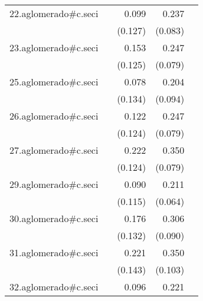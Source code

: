 {\begin{longtable}{l*{4}{D{.}{.}{-1}}}
\addlinespace
22.aglomerado#c.seci&                     &       0.099         &       0.237\sym{**} &                     \\
            &                     &     (0.127)         &     (0.083)         &                     \\
\addlinespace
23.aglomerado#c.seci&                     &       0.153         &       0.247\sym{**} &                     \\
            &                     &     (0.125)         &     (0.079)         &                     \\
\addlinespace
25.aglomerado#c.seci&                     &       0.078         &       0.204\sym{*}  &                     \\
            &                     &     (0.134)         &     (0.094)         &                     \\
\addlinespace
26.aglomerado#c.seci&                     &       0.122         &       0.247\sym{**} &                     \\
            &                     &     (0.124)         &     (0.079)         &                     \\
\addlinespace
27.aglomerado#c.seci&                     &       0.222         &       0.350\sym{***}&                     \\
            &                     &     (0.124)         &     (0.079)         &                     \\
\addlinespace
29.aglomerado#c.seci&                     &       0.090         &       0.211\sym{***}&                     \\
            &                     &     (0.115)         &     (0.064)         &                     \\
\addlinespace
30.aglomerado#c.seci&                     &       0.176         &       0.306\sym{***}&                     \\
            &                     &     (0.132)         &     (0.090)         &                     \\
\addlinespace
31.aglomerado#c.seci&                     &       0.221         &       0.350\sym{***}&                     \\
            &                     &     (0.143)         &     (0.103)         &                     \\
\addlinespace
32.aglomerado#c.seci&                     &       0.096         &       0.221\sym{*}  &                     \\

\end{longtable}}

